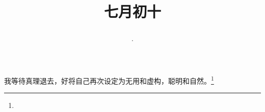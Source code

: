 \title{\date[d=13,m=8,y=2024][year:cn-y,年,month:cn,day:cn,日,·,weekday]·七月初十 }
我等待真理退去，好将自己再次设定为无用和虚构，聪明和自然。\footnote{ }

